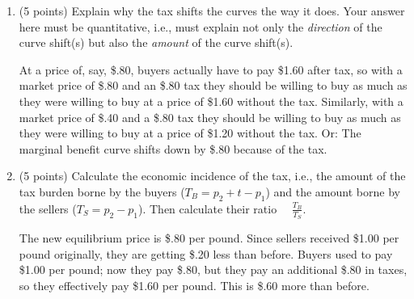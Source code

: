 \documentclass{article}
\begin{document}
\begin{enumerate}
\begin{enumerate}
    \item \begin{EXAM} (5 points) Explain why the tax shifts the curves the way it does. Your answer here must be quantitative, i.e., must explain not only the \emph{direction} of the curve shift(s) but also the \emph{amount} of the curve shift(s). \vspace{1.5in} \end{EXAM}

\begin{KEY} At a price of, say, \$.80, buyers actually have to pay \$1.60 after tax, so with a market price of \$.80 and an \$.80 tax they should be willing to buy as much as they were willing to buy at a price of \$1.60 without the tax. Similarly, with a market price of \$.40 and a \$.80 tax they should be willing to buy as much as they were willing to buy at a price of \$1.20 without the tax. Or: The marginal benefit curve shifts down by \$.80 because of the tax. %
\end{KEY}


    \item \begin{EXAM} (5 points) Calculate the economic incidence of the tax, i.e., the amount of the tax burden borne by the buyers ($T_B=p_2+t-p_1$) and the amount borne by the sellers ($T_S=p_2-p_1$). Then calculate their ratio \ \ $\displaystyle \frac{T_B}{T_S}$. \vspace{1.6in} \end{EXAM}

\begin{KEY} The new equilibrium price is \$.80 per pound. Since sellers received \$1.00 per pound originally, they are getting \$.20 less than before. Buyers used to pay \$1.00 per pound; now they pay \$.80, but they pay an additional \$.80 in taxes, so they effectively pay \$1.60 per pound. This is \$.60 more than before.



\end{KEY}
\end{enumerate}
\end{enumerate}
\end{document}
